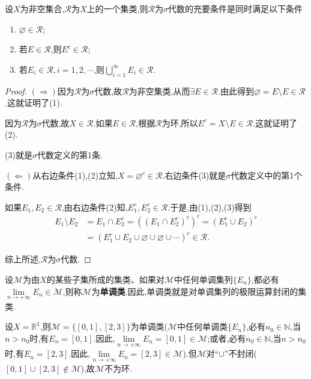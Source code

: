 \documentclass[../../main.tex]{subfiles}%
\begin{document}
\begin{theorem}\label{theorem:集合论--定理1.3.5}
设$X$为非空集合,$\mathscr{R}$为$X$上的一个集类,则$\mathscr{R}$为$\sigma$代数的充要条件是同时满足以下条件
\begin{enumerate}[(1)]
\item $\varnothing \in \mathscr{R}$;
\item 若$E \in \mathscr{R}$,则$E^c \in \mathscr{R}$;
\item 若$E_i \in \mathscr{R},i=1,2,\cdots$,则$\bigcup_{i=1}^{\infty} E_i \in \mathscr{R}$.
\end{enumerate}
\end{theorem}
\begin{proof}

$(\Rightarrow)$因为$\mathscr{R}$为$\sigma$代数,故$\mathscr{R}$为非空集类,从而$\exists E \in \mathscr{R}$.由此得到$\varnothing = E \setminus E \in \mathscr{R}$.这就证明了(1).

因为$\mathscr{R}$为$\sigma$代数,故$X \in \mathscr{R}$.如果$E \in \mathscr{R}$,根据$\mathscr{R}$为环,所以$E^c = X \setminus E \in \mathscr{R}$.这就证明了(2).

(3)就是$\sigma$代数定义的第1条.

$(\Leftarrow)$从右边条件(1),(2)立知,$X = \varnothing^c \in \mathscr{R}$.右边条件(3)就是$\sigma$代数定义中的第1个条件.

如果$E_1,E_2 \in \mathscr{R}$,由右边条件(2)知,$E_1^c,E_2^c \in \mathscr{R}$.于是,由(1),(2),(3)得到
\begin{align*}
E_1 \setminus E_2 &= E_1 \cap E_2^c = \left( (E_1 \cap E_2^c)^c \right)^c = \left( E_1^c \cup E_2 \right)^c \\
&= \left( E_1^c \cup E_2 \cup \varnothing \cup \varnothing \cup \cdots \right)^c \in \mathscr{R}.
\end{align*}

综上所述,$\mathscr{R}$为$\sigma$代数.

\end{proof}

\begin{definition}[单调类]
设$\mathscr{M}$为由$X$的某些子集所成的集类、如果对$\mathscr{M}$中任何单调集列$\{E_n\}$,都必有$\lim\limits_{n \to +\infty} E_n \in \mathscr{M}$,则称$\mathscr{M}$为\textbf{单调类}.因此,单调类就是对单调集列的极限运算封闭的集类.
\end{definition}

\begin{example}
设$X=\mathbb{R}^1$,则$\mathscr{M}=\{[0,1],[2,3]\}$为单调类($\mathscr{M}$中任何单调类$\{E_n\}$,必有$n_0 \in \mathbb{N}$,当$n>n_0$时,有$E_n=[0,1]$.因此,$\lim\limits_{n \to +\infty} E_n=[0,1] \in \mathscr{M}$;或者,必有$n_0 \in \mathbb{N}$,当$n>n_0$时,有$E_n=[2,3]$.因此,$\lim\limits_{n \to +\infty} E_n=[2,3] \in \mathscr{M}$).但$\mathscr{M}$对“$\cup$”不封闭($[0,1] \cup [2,3] \notin \mathscr{M}$),故$\mathscr{M}$不为环.
\end{example}
\end{document}
